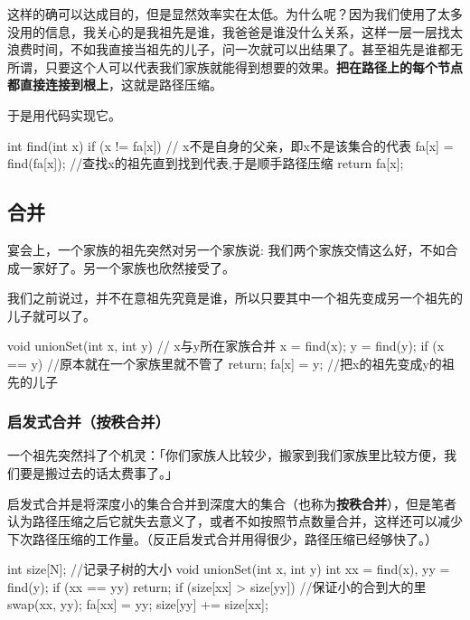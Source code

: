 这样的确可以达成目的，但是显然效率实在太低。为什么呢？因为我们使用了太多没用的信息，我关心的是我祖先是谁，我爸爸是谁没什么关系，这样一层一层找太浪费时间，不如我直接当祖先的儿子，问一次就可以出结果了。甚至祖先是谁都无所谓，只要这个人可以代表我们家族就能得到想要的效果。\textbf{把在路径上的每个节点都直接连接到根上}，这就是路径压缩。 

于是用代码实现它。

\begin{cppcode}
int find(int x) {
  if (x != fa[x])  // x不是自身的父亲，即x不是该集合的代表
    fa[x] = find(fa[x]);  //查找x的祖先直到找到代表,于是顺手路径压缩
  return fa[x];
}
\end{cppcode}

\subsection{合并}

宴会上，一个家族的祖先突然对另一个家族说: 我们两个家族交情这么好，不如合成一家好了。另一个家族也欣然接受了。  

我们之前说过，并不在意祖先究竟是谁，所以只要其中一个祖先变成另一个祖先的儿子就可以了。

\begin{cppcode}
void unionSet(int x, int y)  // x与y所在家族合并
{
  x = find(x);
  y = find(y);
  if (x == y)  //原本就在一个家族里就不管了
    return;
  fa[x] = y;  //把x的祖先变成y的祖先的儿子
}
\end{cppcode}

\subsubsection{启发式合并（按秩合并）}

一个祖先突然抖了个机灵：「你们家族人比较少，搬家到我们家族里比较方便，我们要是搬过去的话太费事了。」  

启发式合并是将深度小的集合合并到深度大的集合（也称为\textbf{按秩合并}），但是笔者认为路径压缩之后它就失去意义了，或者不如按照节点数量合并，这样还可以减少下次路径压缩的工作量。（反正启发式合并用得很少，路径压缩已经够快了。）

\begin{cppcode}
int size[N];  //记录子树的大小
void unionSet(int x, int y) {
  int xx = find(x), yy = find(y);
  if (xx == yy) return;
  if (size[xx] > size[yy])  //保证小的合到大的里
    swap(xx, yy);
  fa[xx] = yy;
  size[yy] += size[xx];
}
\end{cppcode}


